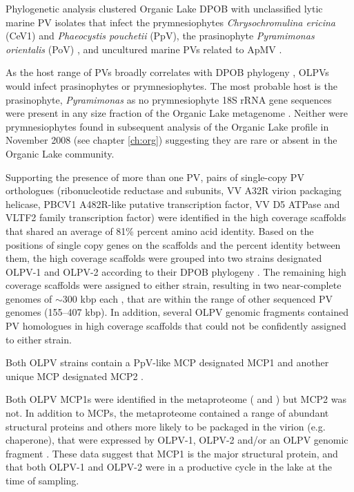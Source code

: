 Phylogenetic analysis clustered Organic Lake \ac{DPOB} with unclassified lytic marine \ac{PV} isolates that infect the prymnesiophytes \emph{Chrysochromulina ericina} (CeV1) and \emph{Phaeocystis pouchetii} (PpV), the prasinophyte \emph{Pyramimonas orientalis} (PoV) \cite{Jacobsen1996, Sandaa2001}, and uncultured marine \acp{PV} related to \ac{ApMV} \cite{Monier2008a, Monier2008b} . 

As the host range of \acp{PV} broadly correlates with \ac{DPOB} phylogeny \cite{Nagasaki2005b, Larsen2008}, \acp{OLPV} would infect prasinophytes or prymnesiophytes. 
The most probable host is the prasinophyte, \emph{Pyramimonas} as no prymnesiophyte 18S \ac{rRNA} gene sequences were present in any size fraction of the Organic Lake metagenome .
Neither were prymnesiophytes found in subsequent analysis of the Organic Lake profile in November 2008 (see chapter \ref{ch:org}) suggesting they are rare or absent in the Organic Lake community.


Supporting the presence of more than one \ac{PV}, pairs of single-copy \ac{PV} orthologues 
(ribonucleotide reductase \textalpha{} and \textbeta{} subunits, VV A32R virion packaging helicase, \textsc{PBCV1} A482R-like putative transcription factor, VV D5 ATPase and VLTF2 family transcription factor) 
were identified in the high coverage scaffolds that shared an average of 81\% percent amino acid identity.
 Based on the positions of single copy genes on the scaffolds and the percent identity between them, the high coverage scaffolds were grouped into two strains designated \ac{OLPV}-1 and \ac{OLPV}-2 according to their \ac{DPOB} phylogeny .
 The remaining high coverage scaffolds were assigned to either strain, resulting in two near-complete genomes of $\sim$300 kbp each , that are within the range of other sequenced \ac{PV} genomes (155--407 kbp). 
In addition, several \ac{OLPV} genomic fragments contained \ac{PV} homologues in high coverage scaffolds that could not be confidently assigned to either strain. 


Both \ac{OLPV} strains contain a PpV-like \ac{MCP} designated \ac{MCP}1 and another unique \ac{MCP} designated \ac{MCP}2 .

Both \ac{OLPV} \ac{MCP}1s were identified in the metaproteome ( and ) but \ac{MCP}2 was not. 
In addition to \acp{MCP}, the metaproteome contained a range of abundant structural proteins and others more likely to be packaged in the virion (e.g. chaperone), that were expressed by \ac{OLPV}-1, \ac{OLPV}-2 and/or an \ac{OLPV} genomic fragment . 
These data suggest that \ac{MCP}1 is the major structural protein, and that both \ac{OLPV}-1 and \ac{OLPV}-2 were in a productive cycle in the lake at the time of sampling. 



